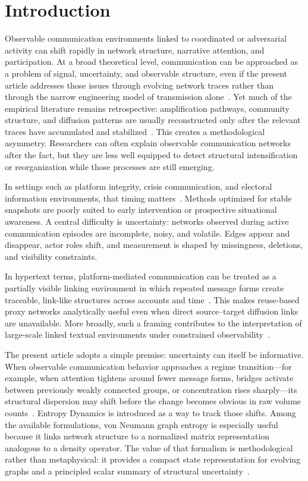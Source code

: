 \documentclass[sigconf]{acmart}
\begin{document}
\section{Introduction}

Observable communication environments linked to coordinated or adversarial activity can shift rapidly in network structure, narrative attention, and participation. At a broad theoretical level, communication can be approached as a problem of signal, uncertainty, and observable structure, even if the present article addresses those issues through evolving network traces rather than through the narrow engineering model of transmission alone~\cite{shannon1949}. Yet much of the empirical literature remains retrospective: amplification pathways, community structure, and diffusion patterns are usually reconstructed only after the relevant traces have accumulated and stabilized~\cite{holme2012,ranshous2015}. This creates a methodological asymmetry. Researchers can often explain observable communication networks after the fact, but they are less well equipped to detect structural intensification or reorganization while those processes are still emerging.

In settings such as platform integrity, crisis communication, and electoral information environments, that timing matters~\cite{GhoshRanu2023,SaezTrumper2014,Zannettou2017}. Methods optimized for stable snapshots are poorly suited to early intervention or prospective situational awareness. A central difficulty is uncertainty: networks observed during active communication episodes are incomplete, noisy, and volatile. Edges appear and disappear, actor roles shift, and measurement is shaped by missingness, deletions, and visibility constraints.

In hypertext terms, platform-mediated communication can be treated as a partially visible linking environment in which repeated message forms create traceable, link-like structures across accounts and time~\cite{Carrino2024,LiadiGraus2023}. This makes reuse-based proxy networks analytically useful even when direct source--target diffusion links are unavailable. More broadly, such a framing contributes to the interpretation of large-scale linked textual environments under constrained observability~\cite{Carrino2024,LiadiGraus2023,AyoobiEtAl2024}.

The present article adopts a simple premise: uncertainty can itself be informative. When observable communication behavior approaches a regime transition---for example, when attention tightens around fewer message forms, bridges activate between previously weakly connected groups, or concentration rises sharply---its structural dispersion may shift before the change becomes obvious in raw volume counts~\cite{YamakawaTajima2023}. Entropy Dynamics is introduced as a way to track those shifts. Among the available formulations, von Neumann graph entropy is especially useful because it links network structure to a normalized matrix representation analogous to a density operator. The value of that formalism is methodological rather than metaphysical: it provides a compact state representation for evolving graphs and a principled scalar summary of structural uncertainty~\cite{passerini2009,chen2019}.
\end{document}
